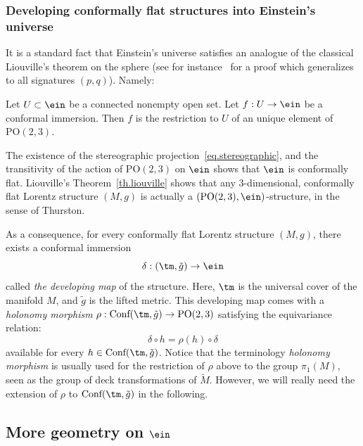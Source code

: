 \subsubsection{Developing conformally flat structures into Einstein's universe}\label{sec.developing}
It is a standard fact that Einstein's universe satisfies an analogue of the classical Liouville's theorem on the sphere (see for instance~\cite[Chapter~7, Corollary~3.5]{sharpe} for a proof which generalizes to all signatures $(p,q)$). Namely:

\begin{theo}\label{th.liouville}
Let $U \subset \ein$ be a connected nonempty open set. Let $f: U \to \ein$ be a conformal immersion. Then $f$ is the restriction to $U$ of an unique element of $\mbox{PO}(2,3)$.
\end{theo}

The existence of the stereographic projection~\eqref{eq.stereographic}, and the transitivity of the action of $\mbox{PO}(2,3)$ on $\ein$ shows that $\ein$ is conformally flat. Liouville's Theorem~\ref{th.liouville} shows that any $3$-dimensional, conformally flat Lorentz structure $(M,g)$ is actually a $(\mbox{PO}(2,3),\ein)$-structure, in the sense of Thurston.

As a consequence, for every conformally flat Lorentz structure $(M,g)$, there exists a conformal immersion
\[
\delta: (\tm,\tilde{g}) \to \ein
\]
called \emph{the developing map} of the structure. Here, $\tm$ is the universal cover of the manifold $M$, and $\tilde{g}$ is the lifted metric. This developing map comes with a \emph{holonomy morphism} $\rho: {\mbox{Conf}(\tm,\tilde{g})} \to \mbox{PO}(2,3)$ satisfying the equivariance relation:
\begin{equation}\label{eq.equiholonomy}
\delta \circ h = \rho(h) \circ \delta
\end{equation}
available for every $h \in {\mbox{Conf}(\tm,\tilde{g})}$. Notice that the terminology \emph{holonomy morphism} is usually used for the restriction of $\rho$ above to the group $\pi_1(M)$, seen as the group of deck transformations of $\tilde{M}$. However, we will really need the extension of $\rho $ to ${\mbox{Conf}(\tm,\tilde{g})}$ in the following.



\subsection{More geometry on \texorpdfstring{$\ein$}{ein}}\label{sec.more.geometry}

